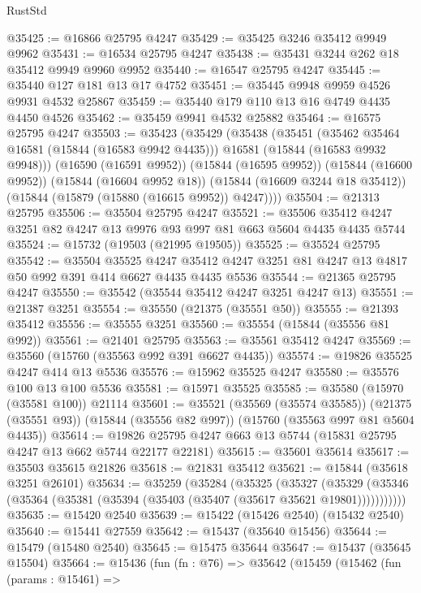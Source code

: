 \begin{lexlean}{RustStd}
\begin{coremodule}
@35425 := @16866 @25795 @4247
@35429 := @35425 @3246 @35412 @9949 @9962
@35431 := @16534 @25795 @4247
@35438 := @35431 @3244 @262 @18 @35412 @9949 @9960 @9952
@35440 := @16547 @25795 @4247
@35445 := @35440 @127 @181 @13 @17 @4752
@35451 := @35445 @9948 @9959 @4526 @9931 @4532 @25867
@35459 := @35440 @179 @110 @13 @16 @4749 @4435 @4450 @4526
@35462 := @35459 @9941 @4532 @25882
@35464 := @16575 @25795 @4247
@35503 := @35423
    (@35429
      (@35438
        (@35451
          (@35462 @35464 @16581 (@15844 (@16583 @9942 @4435)))
          @16581
          (@15844 (@16583 @9932 @9948)))
        (@16590 (@16591 @9952))
        (@15844 (@16595 @9952))
        (@15844 (@16600 @9952))
        (@15844 (@16604 @9952 @18))
        (@15844 (@16609 @3244 @18 @35412))
        (@15844 (@15879 (@15880 (@16615 @9952)) @4247))))
@35504 := @21313 @25795
@35506 := @35504 @25795 @4247
@35521 := @35506 @35412 @4247 @3251 @82 @4247 @13 @9976 @93 @997 @81 @663 @5604 @4435 @4435 @5744
@35524 := @15732 (@19503 (@21995 @19505))
@35525 := @35524 @25795
@35542 := @35504
    @35525
    @4247
    @35412
    @4247
    @3251
    @81
    @4247
    @13
    @4817
    @50
    @992
    @391
    @414
    @6627
    @4435
    @4435
    @5536
@35544 := @21365 @25795 @4247
@35550 := @35542 (@35544 @35412 @4247 @3251 @4247 @13)
@35551 := @21387 @3251
@35554 := @35550 (@21375 (@35551 @50))
@35555 := @21393 @35412
@35556 := @35555 @3251
@35560 := @35554 (@15844 (@35556 @81 @992))
@35561 := @21401 @25795
@35563 := @35561 @35412 @4247
@35569 := @35560 (@15760 (@35563 @992 @391 @6627 @4435))
@35574 := @19826 @35525 @4247 @414 @13 @5536
@35576 := @15962 @35525 @4247
@35580 := @35576 @100 @13 @100 @5536
@35581 := @15971 @35525
@35585 := @35580 (@15970 (@35581 @100)) @21114
@35601 := @35521
    (@35569 (@35574 @35585))
    (@21375 (@35551 @93))
    (@15844 (@35556 @82 @997))
    (@15760 (@35563 @997 @81 @5604 @4435))
@35614 := @19826 @25795 @4247 @663 @13 @5744 (@15831 @25795 @4247 @13 @662 @5744 @22177 @22181)
@35615 := @35601 @35614
@35617 := @35503 @35615 @21826
@35618 := @21831 @35412
@35621 := @15844 (@35618 @3251 @26101)
@35634 := @35259
    (@35284
      (@35325
        (@35327
          (@35329 (@35346 (@35364 (@35381 (@35394 (@35403 (@35407 (@35617 @35621 @19801)))))))))))
@35635 := @15420 @2540
@35639 := @15422 (@15426 @2540) (@15432 @2540)
@35640 := @15441 @27559
@35642 := @15437 (@35640 @15456)
@35644 := @15479 (@15480 @2540)
@35645 := @15475 @35644
@35647 := @15437 (@35645 @15504)
@35664 := @15436
    (fun (fn : @76) =>
    @35642
      (@15459
        (@15462
          (fun (params : @15461) =>

\end{coremodule}
\end{lexlean}
